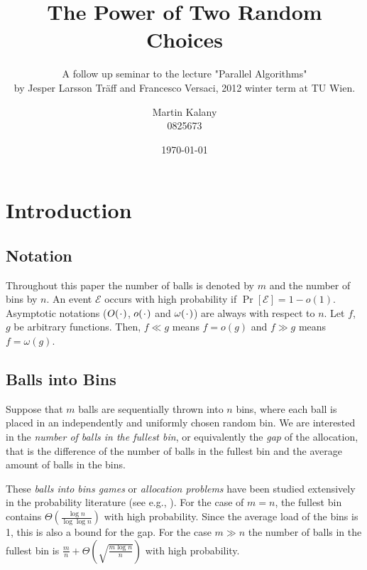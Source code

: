 \documentclass{acm_proc_article-sp}
\newcommand*{\PH}{\makebox[1ex]{\textbf{$\cdot$}}}
\begin{document}
\title{The Power of Two Random Choices}
\subtitle{\large A follow up seminar to the lecture "Parallel Algorithms"\\ by Jesper Larsson Tr\"aff and Francesco Versaci, 2012 winter term at TU Wien.}

\author{
\alignauthor
Martin Kalany\\
       0825673
}    
\date{\today}

\maketitle
\begin{abstract}

\end{abstract}


\section{Introduction}
\label{sec:intro}

\subsection{Notation}
\label{sec:notation}
Throughout this paper the number of balls is denoted by $m$ and the number of bins by $n$. An event $\mathcal E$ occurs with high probability if $\Pr\left[\mathcal E \right] = 1 - o(1)$. Asymptotic notations ($O(\PH)$, $o(\PH)$ and $\omega(\PH)$) are always with respect to $n$. Let $f$, $g$ be arbitrary functions. Then, $f \ll g$ means $f = o(g)$ and $ f \gg g$ means $f = \omega(g)$.

\subsection{Balls into Bins}
\label{sec:ballsIntoBins}
Suppose that $m$ balls are sequentially thrown into $n$ bins, where each ball is placed in an independently and uniformly chosen random bin. We are interested in the \emph{number of balls in the fullest bin}, or equivalently the \emph{gap} of the allocation, that is the difference of the number of balls in the fullest bin and the average amount of balls in the bins. 

These \emph{balls into bins games} or \emph{allocation problems} have been studied extensively in the probability literature (see e.g., \cite{JK77}). For the case of $m = n$, the fullest bin contains $\Theta \left( \frac{\log n}{\log \log n} \right)$ \cite{RS98} with high probability. Since the average load of the bins is 1, this is also a bound for the gap. %
For the case $m \gg n$ the number of balls in the fullest bin is $\frac{m}{n} + \Theta\left(\sqrt{\frac{m \log n}{n}}\right)$ with high probability.
\end{document}
